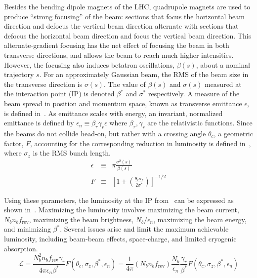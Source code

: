 Besides the bending dipole magnets of the LHC, quadrupole magnets are used to produce ``strong focusing'' of the beam: sections that focus the horizontal beam direction and defocus the vertical beam direction alternate with sections that defocus the horizontal beam direction and focus the vertical beam direction. This alternate-gradient focusing has the net effect of focusing the beam in both transverse directions, and allows the beam to reach much higher intensities. However, the focusing also induces betatron oscillations, $\beta(s)$, about a nominal trajectory $s$. For an approximately Gaussian beam, the RMS of the beam size in the transverse direction is $\sigma(s)$. The value of $\beta(s)$ and $\sigma(s)$ measured at the interaction point (IP) is denoted $\beta^*$ and $\sigma^*$ respectively. A measure of the beam spread in position and momentum space, known as transverse emittance $\epsilon$, is defined in~\Eqn{\ref{eqn:trans_emit}}. As emittance scales with energy, an invariant, normalized emittance is defined by $\epsilon_n\equiv \beta_r\gamma_r\epsilon$ where $\beta_r, \gamma_r$ are the relativistic functions. Since the beams do not collide head-on, but rather with a crossing angle $\theta_c$, a geometric factor, $F$, accounting for the corresponding reduction in luminosity is defined in~\Eqn{\ref{eqn:f_fact}}, where $\sigma_z$ is the RMS bunch length. 
\begin{eqnarray}
\epsilon&\equiv& \pi\frac{\sigma^2(s)}{\beta(s)} \label{eqn:trans_emit} \\
F &\equiv& \left[ 1+ \left(\frac{\theta_c\sigma_z}{2\sigma^{*}} \right) \right]^{-1/2} \label{eqn:f_fact} 
\end{eqnarray}

Using these parameters, the luminosity at the IP from~\Eqn{\ref{eqn:n_evts}} can be expressed as shown in~\Eqn{\ref{eqn:inst_lumi}}.  
Maximizing the luminosity involves maximizing the beam current, $N_bn_bf_{\textrm{rev}}$, maximizing the beam brightness, $N_b/\epsilon_n$, maximizing the beam energy, and minimizing $\beta^{*}$. Several issues arise and limit the maximum achievable luminosity, including beam-beam effects, space-charge, and limited cryogenic absorption.
\begin{equation}
\mathcal{L} = \frac{N_b^2n_bf_{\textrm{rev}}\gamma_r}{4\pi\epsilon_n\beta^{*}}F(\theta_c,\sigma_z,\beta^{*},\epsilon_n) = \frac{1}{4\pi}\left(N_bn_bf_{\textrm{rev}}\right)\frac{N_b}{\epsilon_n}\frac{\gamma_r}{\beta^{*}}F(\theta_c,\sigma_z,\beta^{*},\epsilon_n)
\label{eqn:inst_lumi}
\end{equation}


